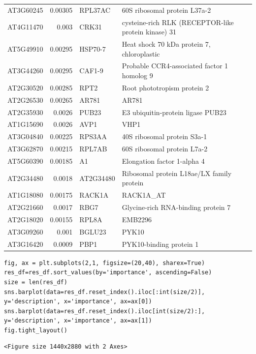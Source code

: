 \documentclass[11pt]{article}
\begin{document}
\begin{center}
\begin{tabular}{lrll}
AT3G60245 & 0.00305 & RPL37AC & 60S ribosomal protein L37a-2\\
AT4G11470 & 0.003 & CRK31 & cysteine-rich RLK (RECEPTOR-like protein kinase) 31\\
AT5G49910 & 0.00295 & HSP70-7 & Heat shock 70 kDa protein 7, chloroplastic\\
AT3G44260 & 0.00295 & CAF1-9 & Probable CCR4-associated factor 1 homolog 9\\
AT2G30520 & 0.00285 & RPT2 & Root phototropism protein 2\\
AT2G26530 & 0.00265 & AR781 & AR781\\
AT2G35930 & 0.0026 & PUB23 & E3 ubiquitin-protein ligase PUB23\\
AT1G15690 & 0.0026 & AVP1 & VHP1\\
AT3G04840 & 0.00225 & RPS3AA & 40S ribosomal protein S3a-1\\
AT3G62870 & 0.00215 & RPL7AB & 60S ribosomal protein L7a-2\\
AT5G60390 & 0.00185 & A1 & Elongation factor 1-alpha 4\\
AT2G34480 & 0.0018 & AT2G34480 & Ribosomal protein L18ae/LX family protein\\
AT1G18080 & 0.00175 & RACK1A & RACK1A\_AT\\
AT2G21660 & 0.0017 & RBG7 & Glycine-rich RNA-binding protein 7\\
AT2G18020 & 0.00155 & RPL8A & EMB2296\\
AT3G09260 & 0.001 & BGLU23 & PYK10\\
AT3G16420 & 0.0009 & PBP1 & PYK10-binding protein 1\\
\end{tabular}
\end{center}

\begin{verbatim}
fig, ax = plt.subplots(2,1, figsize=(20,40), sharex=True)
res_df=res_df.sort_values(by='importance', ascending=False)
size = len(res_df)
sns.barplot(data=res_df.reset_index().iloc[:int(size/2)], y='description', x='importance', ax=ax[0])
sns.barplot(data=res_df.reset_index().iloc[int(size/2):], y='description', x='importance', ax=ax[1])
fig.tight_layout()
\end{verbatim}

\begin{verbatim}
<Figure size 1440x2880 with 2 Axes>
\end{verbatim}
\end{document}

